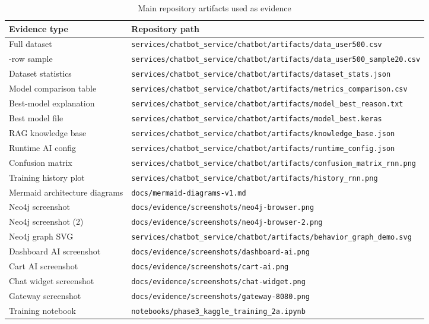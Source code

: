 \documentclass[12pt,a4paper]{article}
\begin{document}
\begin{table}[H]
\centering
\caption{Main repository artifacts used as evidence}
\begin{tabularx}{\linewidth}{>{\raggedright\arraybackslash}p{4cm} >{\raggedright\arraybackslash}X}
\toprule
Evidence type & Repository path \\
\midrule
Full dataset & \texttt{services/chatbot\_service/chatbot/artifacts/data\_user500.csv} \\
20-row sample & \texttt{services/chatbot\_service/chatbot/artifacts/data\_user500\_sample20.csv} \\
Dataset statistics & \texttt{services/chatbot\_service/chatbot/artifacts/dataset\_stats.json} \\
Model comparison table & \texttt{services/chatbot\_service/chatbot/artifacts/metrics\_comparison.csv} \\
Best-model explanation & \texttt{services/chatbot\_service/chatbot/artifacts/model\_best\_reason.txt} \\
Best model file & \texttt{services/chatbot\_service/chatbot/artifacts/model\_best.keras} \\
RAG knowledge base & \texttt{services/chatbot\_service/chatbot/artifacts/knowledge\_base.json} \\
Runtime AI config & \texttt{services/chatbot\_service/chatbot/artifacts/runtime\_config.json} \\
Confusion matrix & \texttt{services/chatbot\_service/chatbot/artifacts/confusion\_matrix\_rnn.png} \\
Training history plot & \texttt{services/chatbot\_service/chatbot/artifacts/history\_rnn.png} \\
Mermaid architecture diagrams & \texttt{docs/mermaid-diagrams-v1.md} \\
Neo4j screenshot & \texttt{docs/evidence/screenshots/neo4j-browser.png} \\
Neo4j screenshot (2) & \texttt{docs/evidence/screenshots/neo4j-browser-2.png} \\
Neo4j graph SVG & \texttt{services/chatbot\_service/chatbot/artifacts/behavior\_graph\_demo.svg} \\
Dashboard AI screenshot & \texttt{docs/evidence/screenshots/dashboard-ai.png} \\
Cart AI screenshot & \texttt{docs/evidence/screenshots/cart-ai.png} \\
Chat widget screenshot & \texttt{docs/evidence/screenshots/chat-widget.png} \\
Gateway screenshot & \texttt{docs/evidence/screenshots/gateway-8080.png} \\
Training notebook & \texttt{notebooks/phase3\_kaggle\_training\_2a.ipynb} \\
\bottomrule
\end{tabularx}
\end{table}
\end{document}
